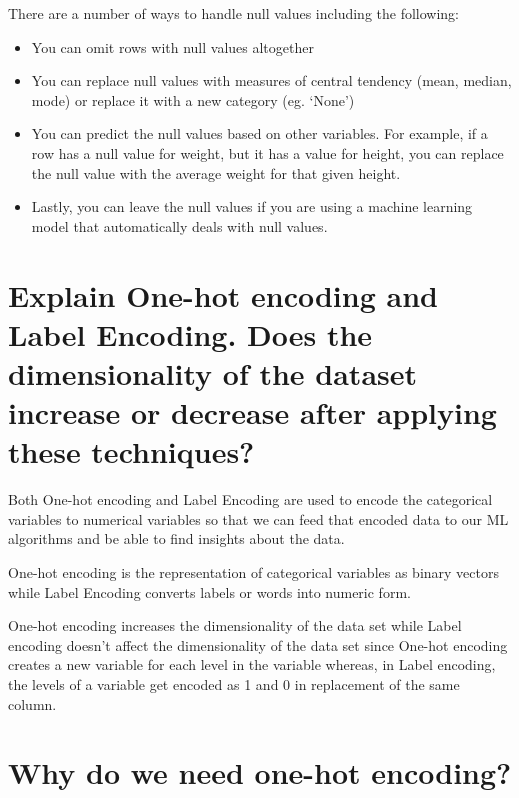 \documentclass[
]{book}
\begin{document}
There are a number of ways to handle null values including the following:

\begin{itemize}
\item
  You can omit rows with null values altogether
\item
  You can replace null values with measures of central tendency (mean, median, mode) or replace it with a new category (eg. `None')
\item
  You can predict the null values based on other variables. For example, if a row has a null value for weight, but it has a value for height, you can replace the null value with the average weight for that given height.
\item
  Lastly, you can leave the null values if you are using a machine learning model that automatically deals with null values.
\end{itemize}

\hypertarget{explain-one-hot-encoding-and-label-encoding.-does-the-dimensionality-of-the-dataset-increase-or-decrease-after-applying-these-techniques}{%
\section{Explain One-hot encoding and Label Encoding. Does the dimensionality of the dataset increase or decrease after applying these techniques?}\label{explain-one-hot-encoding-and-label-encoding.-does-the-dimensionality-of-the-dataset-increase-or-decrease-after-applying-these-techniques}}

Both One-hot encoding and Label Encoding are used to encode the categorical variables to numerical variables so that we can feed that encoded data to our ML algorithms and be able to find insights about the data.

One-hot encoding is the representation of categorical variables as binary vectors while Label Encoding converts labels or words into numeric form.

One-hot encoding increases the dimensionality of the data set while Label encoding doesn't affect the dimensionality of the data set since One-hot encoding creates a new variable for each level in the variable whereas, in Label encoding, the levels of a variable get encoded as 1 and 0 in replacement of the same column.

\hypertarget{why-do-we-need-one-hot-encoding}{%
\section{Why do we need one-hot encoding?}\label{why-do-we-need-one-hot-encoding}}
\end{document}
